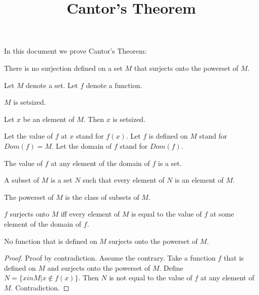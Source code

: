 \documentclass{article}
\title{Cantor's Theorem}
\author{}
\date{}
\begin{document}

  \maketitle

  In this document we prove Cantor's Theorem:

  \begin{theorem}
    There is no surjection defined on a set $M$ that surjects onto the powerset of $M$.
  \end{theorem}

  \begin{forthel}

    Let $M$ denote a set. Let $f$ denote a function.

    \begin{axiom}
        $M$ is setsized.
    \end{axiom}

    \begin{axiom}
        Let $x$ be an element of $M$. Then $x$ is setsized.
    \end{axiom}

    Let the value of $f$ at $x$ stand for $f(x)$. Let $f$ is defined on $M$ stand for $Dom(f) = M$. Let the domain of $f$ stand for $Dom(f)$.


    \begin{axiom}
      The value of $f$ at any element of the domain of $f$ is a set.
    \end{axiom}

    \begin{definition}[subset]
      A subset of $M$ is a set $N$ such that every element of $N$ is an element of $M$.
    \end{definition}

    \begin{definition}
      The powerset of $M$ is the class of subsets of $M$.
    \end{definition}

    \begin{definition}
      $f$ surjects onto $M$ iff every element of $M$ is equal to the value of $f$ at some element of the domain of $f$.
    \end{definition}

    \begin{proposition}
      No function that is defined on $M$ surjects onto the powerset of $M$.
    \end{proposition}
    \begin{proof}
      Proof by contradiction. Assume the contrary. Take a function $f$ that is defined on $M$ and surjects onto the powerset of $M$. Define $N = \{ x in M | x \notin f(x) \}$. Then $N$ is not equal to the value of $f$ at any element of $M$. Contradiction.
    \end{proof}

  \end{forthel}
\end{document}
